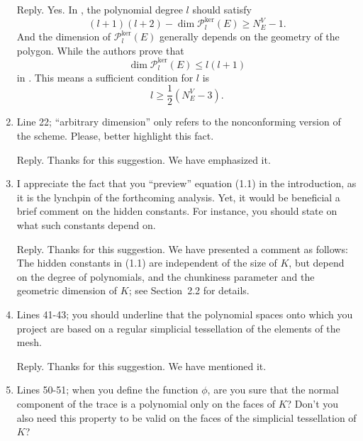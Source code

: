 \documentclass[10pt]{amsart}
\theoremstyle{definition}
\theoremstyle{remark}
\begin{document}
\begin{enumerate}[1.]
\smallskip \noindent \textcolor[rgb]{1.00,0.00,0.00}{Reply.}
Yes. In \cite{BerroneBorioMarcon2021}, the polynomial degree $l$ should satisfy
$$
(l+1)(l+2) - \dim\mathcal{P}_l^{\textrm{ker}}(E)\geq N_E^V-1.
$$
And the dimension of $\mathcal{P}_l^{\textrm{ker}}(E)$ generally depends on the geometry of the polygon. While the authors prove that
$$
\dim\mathcal{P}_l^{\textrm{ker}}(E)\leq l(l+1)
$$
in \cite[Theorem 2]{BerroneBorioMarcon2021}. This means a sufficient condition for $l$ is 
$$
l\geq \frac{1}{2}(N_E^V-3).
$$

\medskip

\item \textsf{Line 22; ``arbitrary dimension'' only refers to the nonconforming version of the scheme. Please, better highlight this fact.}

\smallskip \noindent \textcolor[rgb]{1.00,0.00,0.00}{Reply.}
Thanks for this suggestion. We have emphasized it.

\medskip

\item \textsf{I appreciate the fact that you “preview” equation (1.1) in the introduction, as it is the lynchpin of the forthcoming analysis. Yet, it would be beneficial a brief comment on the hidden constants. For instance, you should state on what such constants depend on.}

\smallskip \noindent \textcolor[rgb]{1.00,0.00,0.00}{Reply.}
Thanks for this suggestion. We have presented a comment as follows: The hidden constants in (1.1) are independent of the size of $K$, but depend on the degree of polynomials, and the chunkiness parameter and the geometric dimension of $K$; see Section~2.2 for details.

\medskip

\item \textsf{Lines 41-43; you should underline that the polynomial spaces onto which you project are based on a regular simplicial tessellation of the elements of the mesh.}

\smallskip \noindent \textcolor[rgb]{1.00,0.00,0.00}{Reply.}
Thanks for this suggestion. We have mentioned it.


\medskip

\item \textsf{Lines 50-51; when you define the function $\phi$, are you sure that the normal component of the trace is a polynomial only on the faces of $K$? Don't you also need this property to be valid on the faces of the simplicial tessellation of $K$?}


\end{enumerate}
\end{document}
